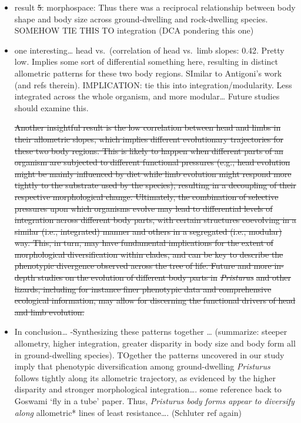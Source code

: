 \documentclass[
  11pt,
]{article}
\providecommand{\tightlist}{%
  \setlength{\itemsep}{0pt}\setlength{\parskip}{0pt}}
\providecommand{\DIFaddtex}[1]{{\protect\color{blue}\uwave{#1}}} %
\providecommand{\DIFdeltex}[1]{{\protect\color{red}\sout{#1}}}                      %
\providecommand{\DIFaddbegin}{} %
\providecommand{\DIFaddend}{} %
\providecommand{\DIFdelbegin}{} %
\providecommand{\DIFdelend}{} %
\providecommand{\DIFadd}[1]{\texorpdfstring{\DIFaddtex{#1}}{#1}} %
\providecommand{\DIFdel}[1]{\texorpdfstring{\DIFdeltex{#1}}{}} %
\newcommand{\DIFscaledelfig}{0.5}
\newlength{\DIFdelgraphicswidth} %
\newlength{\DIFdelgraphicsheight} %
\newcommand{\DIFaddincludegraphics}[2][]{{\color{blue}\fbox{\DIFOincludegraphics[#1]{#2}}}} %
\newcommand{\DIFdelincludegraphics}[2][]{%
\sbox{\DIFdelgraphicsbox}{\DIFOincludegraphics[#1]{#2}}%
\settoboxwidth{\DIFdelgraphicswidth}{\DIFdelgraphicsbox} %
\settoboxtotalheight{\DIFdelgraphicsheight}{\DIFdelgraphicsbox} %
\scalebox{\DIFscaledelfig}{%
\parbox[b]{\DIFdelgraphicswidth}{\usebox{\DIFdelgraphicsbox}\\[-\baselineskip] \rule{\DIFdelgraphicswidth}{0em}}\llap{\resizebox{\DIFdelgraphicswidth}{\DIFdelgraphicsheight}{%
\setlength{\unitlength}{\DIFdelgraphicswidth}%
\begin{picture}(1,1)%
\thicklines\linethickness{2pt} %
{\color[rgb]{1,0,0}\put(0,0){\framebox(1,1){}}}%
{\color[rgb]{1,0,0}\put(0,0){\line( 1,1){1}}}%
{\color[rgb]{1,0,0}\put(0,1){\line(1,-1){1}}}%
\end{picture}%
}\hspace*{3pt}}} %
} %
\DeclareRobustCommand{\DIFaddbegin}{\DIFOaddbegin \let\includegraphics\DIFaddincludegraphics} %
\DeclareRobustCommand{\DIFaddend}{\DIFOaddend \let\includegraphics\DIFOincludegraphics} %
\DeclareRobustCommand{\DIFdelbegin}{\DIFOdelbegin \let\includegraphics\DIFdelincludegraphics} %
\DeclareRobustCommand{\DIFdelend}{\DIFOaddend \let\includegraphics\DIFOincludegraphics} %
\begin{document}
\begin{itemize}
\DIFdelend \item
  result \DIFdelbegin \DIFdel{5}\DIFdelend \DIFaddbegin \DIFadd{4}\DIFaddend : morphospace: Thus there was a reciprocal relationship
  between body shape and body size across ground-dwelling and
  rock-dwelling species. SOMEHOW TIE THIS TO integration (DCA pondering
  this one)
\item
  one interesting\ldots{} head vs.~(correlation of head vs.~limb slopes:
  0.42. Pretty low. Implies some sort of differential something here,
  resulting in distinct allometric patterns for these two body regions.
  SImilar to Antigoni's work (and refs therein). IMPLICATION: tie this
  into integration/modularity. Less integrated across the whole
  organism, and more modular\ldots{} Future studies should examine this.
\DIFdelbegin %

\DIFdel{Another insightful result is the low correlation between head and limbs
in their allometric slopes, which implies different evolutionary
trajectories for these two body regions. This is likely to happen when
different parts of an organism are subjected to different functional
pressures (e.g., head evolution might be mainly influenced by diet while
limb evolution might respond more tightly to the substrate used by the
species), resulting in a decoupling of their respective morphological
change. Ultimately, the combination of selective pressures upon which
organisms evolve may lead to differential levels of integration across
different body parts, with certain structures coevolving in a similar
(i.e., integrated) manner and others in a segregated (i.e., modular)
way. This, in turn, may have fundamental implications for the extent of
morphological diversification within clades, and can be key to describe
the phenotypic divergence observed across the tree of life. Future and
more in-depth studies on the evolution of different body parts in
}\emph{\DIFdel{Pristurus}} %
\DIFdel{and other lizards, including for instance finer
phenotypic data and comprehensive ecological information, may allow for
discerning the functional drivers of head and limb evolution.
}%

\DIFdelend \item
  In conclusion\ldots{} -Synthesizing these patterns together \ldots{}
  (summarize: steeper allometry, higher integration, greater disparity
  in body size and body form all in ground-dwelling species). TOgether
  the patterns uncovered in our study imply that phenotypic
  diversification among ground-dwelling \emph{Pristurus} follows tightly
  along its allometric trajectory, as evidenced by the higher disparity
  and stronger morphological integration\ldots. some reference back to
  Goswami `fly in a tube' paper. Thus, \emph{Pristurus body forms appear
  to diversify along }allometric* lines of least resistance\ldots.
  (Schluter ref again)
\end{itemize}
\end{document}
